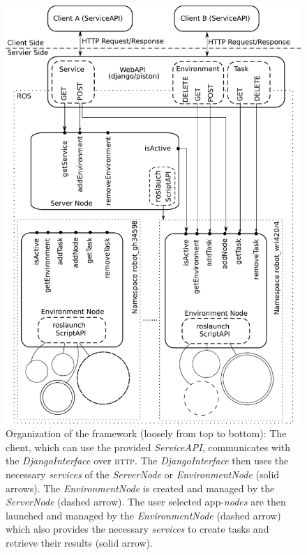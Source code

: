 \documentclass[10pt,a4paper]{article}
\begin{document}
		\begin{figure}
			\begin{center}
				\def\svgwidth{\columnwidth}
				\includegraphics{frameworkOverview.pdf}				
				\caption{Organization of the framework (loosely from top to bottom): The client,
				which can use the provided \emph{ServiceAPI}, communicates with the
				\emph{DjangoInterface} over \textsc{http}. The \emph{DjangoInterface} then uses the
				necessary \emph{services} of the \emph{ServerNode} or \emph{EnvironmentNode} (solid
				arrows). The \emph{EnvironmentNode} is created and managed by the \emph{ServerNode}
				(dashed arrow). The user selected app-\emph{nodes} are then launched and managed by
				the \emph{EnvironmentNode} (dashed arrow) which also provides the necessary
				\emph{services} to create tasks and retrieve their results (solid arrow).}
				\label{fig:diagram}
			\end{center}
		\end{figure}
\end{document}
